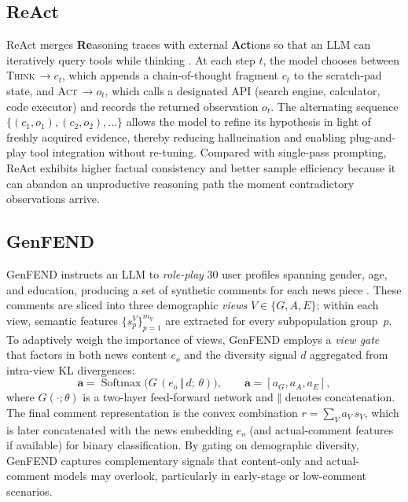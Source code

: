 \subsection{ReAct}\label{sec:llm:react}
ReAct merges \textbf{Re}asoning traces with external \textbf{Act}ions so that an
LLM can iteratively query tools while thinking \cite{yao2022react}.
At each step $t$, the model chooses between
\textsc{Think}\,$\rightarrow c_{t}$, which appends a chain-of-thought fragment
$c_{t}$ to the scratch-pad state, and
\textsc{Act}\,$\rightarrow o_{t}$, which calls a designated API
(search engine, calculator, code executor) and records the returned
observation $o_{t}$.
The alternating sequence
$\{(c_{1},o_{1}), (c_{2},o_{2}),\dots\}$ allows the model to refine its
hypothesis in light of freshly acquired evidence, thereby reducing
hallucination and enabling plug-and-play tool integration without
re-tuning.
Compared with single-pass prompting, ReAct exhibits higher factual
consistency and better sample efficiency because it can abandon an
unproductive reasoning path the moment contradictory observations
arrive.

\subsection{GenFEND}\label{sec:llm:genfend}
GenFEND instructs an LLM to \textit{role-play} 30 user profiles
spanning gender, age, and education, producing a set of synthetic
comments for each news piece \cite{genfend_2024}.
These comments are sliced into three demographic \textit{views}
$V\!\in\!\{G,A,E\}$; within each view, semantic features
$\{s_{p}^{V}\}_{p=1}^{m_{V}}$ are extracted for every subpopulation
group~$p$.
To adaptively weigh the importance of views, GenFEND employs a
\emph{view gate} that factors in both news content $e_{o}$ and the
diversity signal $d$ aggregated from intra-view KL divergences:
\begin{equation}
\mathbf a=\operatorname{Softmax}\!\bigl(
        G\,(e_{o}\,\Vert\,d;\,\theta)
      \bigr),
\qquad
\mathbf a=[a_{G},a_{A},a_{E}],
\label{eq:genfend_gate}
\end{equation}
where $G(\cdot;\theta)$ is a two-layer feed-forward network and
$\Vert$ denotes concatenation.
The final comment representation is the convex combination
$r=\sum_{V} a_{V}\,s_{V}$, which is later concatenated with the
news embedding $e_{o}$ (and actual-comment features if available)
for binary classification.
By gating on demographic diversity, GenFEND captures complementary
signals that content-only and actual-comment models may overlook,
particularly in early-stage or low-comment scenarios.
